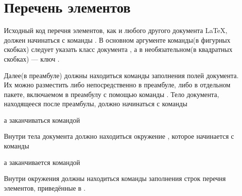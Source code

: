 
\section{Перечень элементов}

Исходный код перечня элементов, как и любого другого документа \LaTeX{}, должен
начинаться с команды . В основном аргументе
команды(в фигурных скобках) следует указать класс документа , а в
необязательном(в квадратных скобках) --- ключ .


Далее(в преамбуле) должны находиться команды заполнения полей документа. Их можно
разместить либо непосредственно в преамбуле, либо в отдельном пакете, включаемом в
преамбулу с помощью команды . Тело документа,
находящееся после преамбулы, должно начинаться с команды


а заканчиваться командой


Внутри тела документа должно находиться
окружение , которое начинается с команды


а заканчивается командой


Внутри окружения  должны находиться команды заполнения строк
перечня элементов, приведённые в .\newpage


